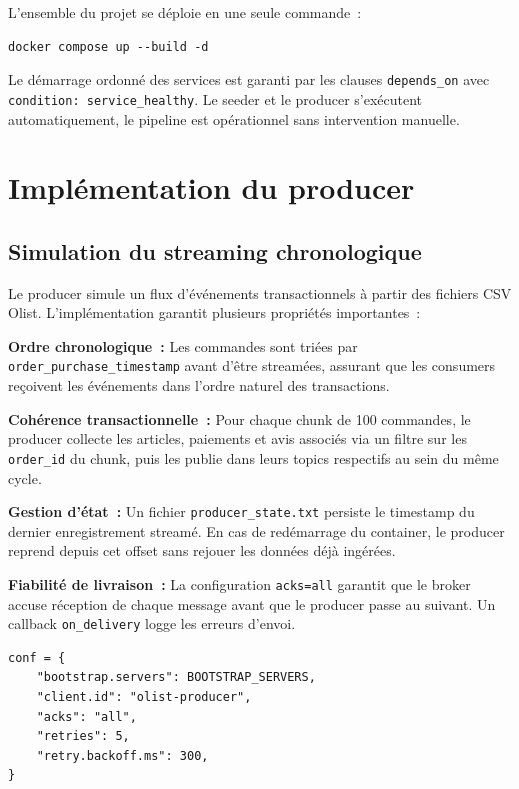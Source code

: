 L'ensemble du projet se déploie en une seule commande~:

\begin{verbatim}
docker compose up --build -d
\end{verbatim}

Le démarrage ordonné des services est garanti par les clauses \texttt{depends\_on} avec \texttt{condition: service\_healthy}. Le seeder et le producer s'exécutent automatiquement, le pipeline est opérationnel sans intervention manuelle.

\section{Implémentation du producer}

\subsection{Simulation du streaming chronologique}

Le producer simule un flux d'événements transactionnels à partir des fichiers CSV Olist. L'implémentation garantit plusieurs propriétés importantes~:

\textbf{Ordre chronologique~:} Les commandes sont triées par \texttt{order\_purchase\_timestamp} avant d'être streamées, assurant que les consumers reçoivent les événements dans l'ordre naturel des transactions.

\textbf{Cohérence transactionnelle~:} Pour chaque chunk de 100 commandes, le producer collecte les articles, paiements et avis associés via un filtre sur les \texttt{order\_id} du chunk, puis les publie dans leurs topics respectifs au sein du même cycle.

\textbf{Gestion d'état~:} Un fichier \texttt{producer\_state.txt} persiste le timestamp du dernier enregistrement streamé. En cas de redémarrage du container, le producer reprend depuis cet offset sans rejouer les données déjà ingérées.

\textbf{Fiabilité de livraison~:} La configuration \texttt{acks=all} garantit que le broker accuse réception de chaque message avant que le producer passe au suivant. Un callback \texttt{on\_delivery} logge les erreurs d'envoi.

\begin{verbatim}
conf = {
    "bootstrap.servers": BOOTSTRAP_SERVERS,
    "client.id": "olist-producer",
    "acks": "all",
    "retries": 5,
    "retry.backoff.ms": 300,
}
\end{verbatim}


